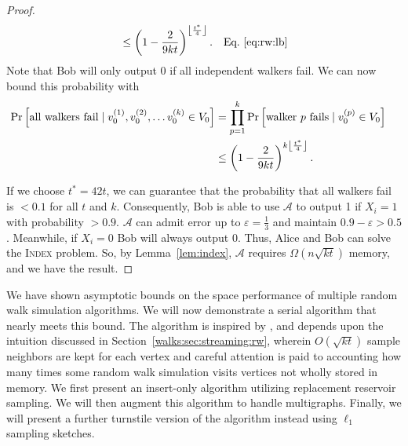 \documentclass{report}
\newcommand{\algoname}[1]{\textnormal{\textsc{#1}}}
\begin{document}
\begin{proof}
\begin{align*}
&\leq
\left ( 1 - \frac{2}{9kt} \right ) ^ {\left \lfloor \frac{t^*}{4} \right \rfloor}.
& \textnormal{Eq.~\eqref{eq:rw:lb}}
\end{align*}
%
Note that Bob will only output 0 if all independent walkers fail. 
We can now bound this probability with 
%
\begin{align*}
\Pr \left [ \textnormal{all walkers fail} \mid v_0^{(1)}, v_0^{(2)}, \dots v_0^{(k)} \in V_0 \right ]
&=
\prod\limits_{p=1}^{k} \Pr \left [ \textnormal{walker $p$ fails} \mid v_0^{(p)} \in V_0 \right ]
&
\\
&\leq
\left ( 1 - \frac{2}{9kt} \right ) ^ {k\left \lfloor \frac{t^*}{4} \right \rfloor}.
&
\end{align*}
%

If we choose $t^* = 42 t$, we can guarantee that the probability that all walkers fail is $< 0.1$ for all $t$ and $k$. 
Consequently, Bob is able to use $\mathcal{A}$ to output 1 if $X_i = 1$ with probability $> 0.9$. 
$\mathcal{A}$ can admit error up to $\varepsilon = \frac{1}{3}$ and maintain $0.9 - \varepsilon > 0.5$.
Meanwhile, if $X_i = 0$ Bob will always output $0$.
Thus, Alice and Bob can solve the \algoname{Index} problem.
So, by Lemma~\ref{lem:index}, $\mathcal{A}$ requires $\Omega(n\sqrt{kt})$ memory, and we have the result.
\end{proof}

We have shown asymptotic bounds on the space performance of multiple random walk simulation algorithms.
We will now demonstrate a serial algorithm that nearly meets this bound.
The algorithm is inspired by \cite{jin2018simulating}, and depends upon the intuition discussed in Section~\ref{walks:sec:streaming:rw}, wherein $O(\sqrt{kt})$ sample neighbors are kept for each vertex and careful attention is paid to accounting how many times some random walk simulation visits vertices not wholly stored in memory.
We first present an insert-only algorithm utilizing replacement reservoir sampling.
We will then augment this algorithm to handle multigraphs.
Finally, we will present a further turnstile version of the algorithm instead using $\ell_1$ sampling sketches.

\end{document}
